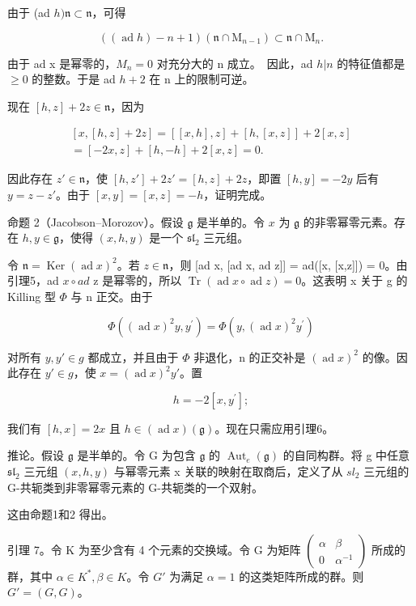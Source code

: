 由于 (ad \(h)\mathfrak{n}\subset \mathfrak{n}\)，可得

\[
((\operatorname{ad} h) - n + 1) (\mathfrak {n} \cap \mathrm{M} _ {n - 1}) \subset \mathfrak {n} \cap \mathrm{M} _ {n}.
\]

由于 ad x 是幂零的，\(M_{n} = 0\) 对充分大的 n 成立。~因此，ad \(h|n\) 的特征值都是 \(\geq 0\) 的整数。于是 ad \(h + 2\) 在 n 上的限制可逆。

现在 \([h,z] + 2z\in \mathfrak{n}\)，因为

\[
\begin{array}{r} [ x, [ h, z ] + 2 z ] = [ [ x, h ], z ] + [ h, [ x, z ] ] + 2 [ x, z ] \\ = [ - 2 x, z ] + [ h, - h ] + 2 [ x, z ] = 0. \end{array}
\]

因此存在 \(z' \in \mathfrak{n}\)，使 \([h, z'] + 2z' = [h, z] + 2z\)，即置 \([h, y] = -2y\) 后有 \(y = z - z'\)。由于 \([x, y] = [x, z] = -h\)，证明完成。

命题 2（Jacobson–Morozov）。假设 \(\mathfrak{g}\) 是半单的。令 \(x\) 为 \(\mathfrak{g}\) 的非零幂零元素。存在 \(h, y \in \mathfrak{g}\)，使得 \((x, h, y)\) 是一个 \(\mathfrak{sl}_2\) 三元组。

令 \(\mathfrak{n}=\operatorname{Ker}(\operatorname{ad}x)^{2}\)。若 \(z\in\mathfrak{n}\)，则 {[}ad x, {[}ad x, ad z{]}{]} = ad({[}x, {[}x,z{]}{]}) = 0。由引理5，ad \(x\circ ad\) z 是幂零的，所以 \(\operatorname{Tr}(\operatorname{ad}x\circ\operatorname{ad}z)=0\)。这表明 x 关于 g 的 Killing 型 \(\Phi\) 与 n 正交。由于

\[
\Phi ((\operatorname{ad} x) ^ {2} y, y ^ {\prime}) = \Phi (y, (\operatorname{ad} x) ^ {2} y ^ {\prime})
\]

对所有 \(y, y' \in g\) 都成立，并且由于 \(\Phi\) 非退化，n 的正交补是 \((\operatorname{ad} x)^{2}\) 的像。因此存在 \(y' \in g\)，使 \(x = (\operatorname{ad} x)^{2}y'\)。置

\[
h = - 2 [ x, y ^ {\prime} ];
\]

我们有 \([h,x]=2x\) 且 \(h\in(\operatorname{ad}x)(\mathfrak{g})\)。现在只需应用引理6。

推论。假设 \(\mathfrak{g}\) 是半单的。令 \(\mathrm{G}\) 为包含 \(\mathfrak{g}\) 的 \(\operatorname{Aut}_e(\mathfrak{g})\) 的自同构群。将 g 中任意 \(\mathfrak{sl}_2\) 三元组 \((x,h,y)\) 与幂零元素 x 关联的映射在取商后，定义了从 \(sl_{2}\) 三元组的 G-共轭类到非零幂零元素的 G-共轭类的一个双射。

这由命题1和2 得出。

引理 7。令 K 为至少含有 4 个元素的交换域。令 G 为矩阵 \(\begin{pmatrix}\alpha&\beta\\0&\alpha^{-1}\end{pmatrix}\) 所成的群，其中 \(\alpha\in K^{*},\beta\in K\)。令 \(G'\) 为满足 \(\alpha=1\) 的这类矩阵所成的群。则 \(G'=(G,G)\)。

